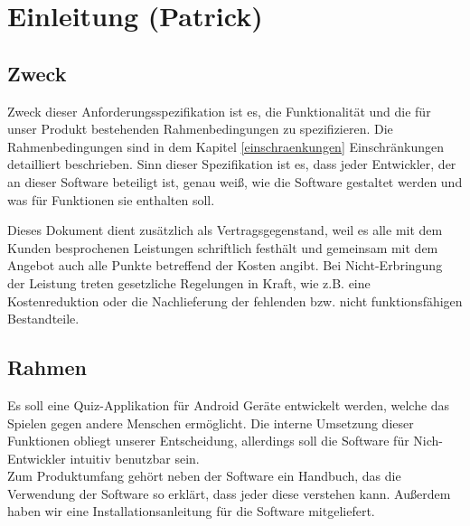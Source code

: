 \documentclass[fontsize=12pt,paper=a4,twoside]{scrartcl}
\newcommand{\highlight}[1]{\textcolor{blue}{\textbf{#1}}}
\newcommand{\nurlangversion}[0]{%
\ifthenelse{\boolean{langversion}}{\highlight{}}{\highlight{Entfällt in SWP-1}}}
\begin{document}
\section{Einleitung (Patrick)}
\nurlangversion


\subsection{Zweck}
  
Zweck dieser Anforderungsspezifikation ist es, die Funktionalität und die für unser Produkt bestehenden Rahmenbedingungen zu spezifizieren. Die Rahmenbedingungen sind in dem Kapitel \ref{einschraenkungen} Einschränkungen detailliert beschrieben. Sinn dieser Spezifikation ist es, dass jeder Entwickler, der an dieser Software beteiligt ist, genau weiß, wie die Software gestaltet werden und was für Funktionen sie enthalten soll.

Dieses Dokument dient zusätzlich als Vertragsgegenstand, weil es alle mit dem Kunden besprochenen Leistungen schriftlich festhält und gemeinsam mit dem Angebot auch alle Punkte betreffend der Kosten angibt. Bei Nicht-Erbringung der Leistung treten gesetzliche Regelungen in Kraft, wie z.B. eine Kostenreduktion oder die Nachlieferung der fehlenden bzw. nicht funktionsfähigen Bestandteile.

\subsection{Rahmen}
  
Es soll eine Quiz-Applikation für Android Geräte entwickelt werden, welche das Spielen gegen andere Menschen ermöglicht. Die interne Umsetzung dieser Funktionen obliegt unserer Entscheidung, allerdings soll die Software für Nich-Entwickler intuitiv benutzbar sein.\\

Zum Produktumfang gehört neben der Software ein Handbuch, das die Verwendung der Software so erklärt, dass jeder diese verstehen kann. Außerdem haben wir eine Installationsanleitung für die Software mitgeliefert.
\end{document}
